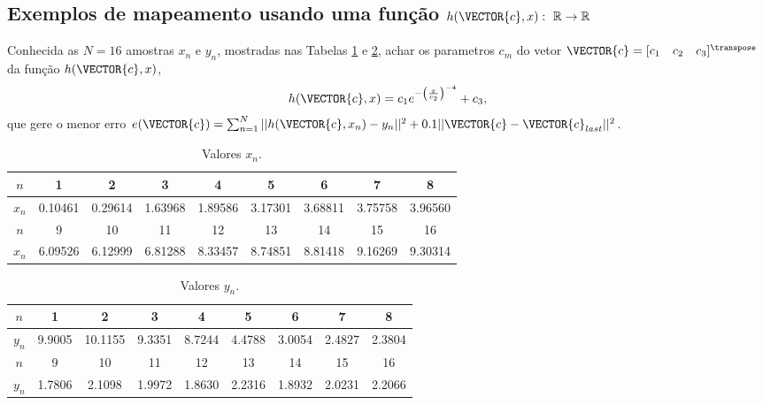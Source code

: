 \subsection{Exemplos de mapeamento usando uma função
$h(\VECTOR{c},x):~\mathbb{R} \rightarrow \mathbb{R}$}

\begin{example}\label{ex:theo:maphcxr1r1}
Conhecida as $N=16$ amostras $x_n$ e $y_n$, mostradas nas  Tabelas \ref{table:theo:maphcxr1r1:xn} e \ref{table:theo:maphcxr1r1:yn},
achar os parametros $c_m$ do vetor $\VECTOR{c}=[c_1\quad c_2\quad c_3]^{\transpose}$ da função $h(\VECTOR{c},x)$, 
\begin{equation}
h(\VECTOR{c},x)=c_1 e^{-\left(\frac{x}{c_2}\right)^{-4}}+c_3,
\end{equation}
que gere o menor erro 
$e(\VECTOR{c})= \sum_{n=1}^{N} ||h(\VECTOR{c},x_n)-y_n||^2 + 0.1 ||\VECTOR{c}-\VECTOR{c}_{last}||^2 $.
\end{example}


\begin{table}[h!]
\centering
\begin{tabular}{|c|c|c|c|c|c|c|c|c|} 
 \hline
$n$   & 1 & 2 & 3 & 4 & 5 & 6 & 7 & 8\\ \hline
$x_n$ & 0.10461 & 0.29614 & 1.63968 & 1.89586 & 3.17301 & 3.68811 & 3.75758 & 3.96560 \\ \hline
 \hline
$n$   & 9 & 10 & 11 & 12 & 13 & 14 & 15 & 16\\  \hline
$x_n$ & 6.09526 & 6.12999 & 6.81288 & 8.33457 & 8.74851 & 8.81418 & 9.16269 & 9.30314 \\ \hline
\end{tabular}
\caption{Valores $x_n$.}
\label{table:theo:maphcxr1r1:xn}
\end{table}

\begin{table}[h!]
\centering
\begin{tabular}{|c|c|c|c|c|c|c|c|c|} 
 \hline
$n$   & 1 & 2 & 3 & 4 & 5 & 6 & 7 & 8\\ \hline
$y_n$ & 9.9005 & 10.1155 & 9.3351 & 8.7244 & 4.4788 & 3.0054 & 2.4827 & 2.3804  \\ \hline
 \hline
$n$   & 9 & 10 & 11 & 12 & 13 & 14 & 15 & 16\\  \hline
$y_n$ & 1.7806 & 2.1098 & 1.9972 & 1.8630 & 2.2316 & 1.8932 & 2.0231 & 2.2066 \\ \hline
\end{tabular}
\caption{Valores $y_n$.}
\label{table:theo:maphcxr1r1:yn}
\end{table}

